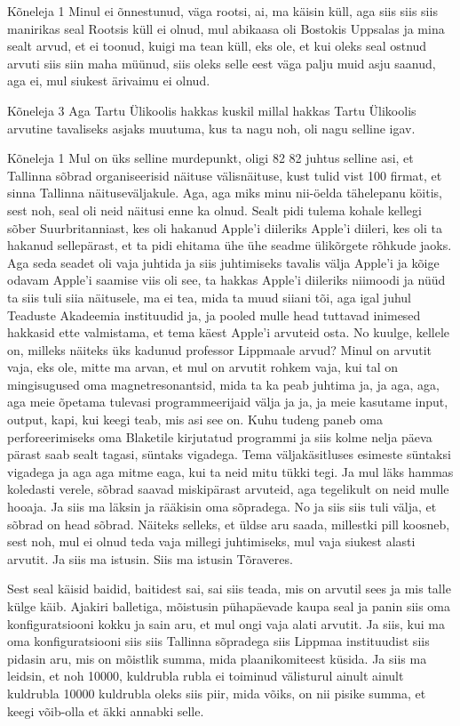 Kõneleja 1
Minul ei õnnestunud, väga rootsi, ai, ma käisin küll, aga siis siis siis manirikas seal Rootsis küll ei olnud, mul abikaasa oli Bostokis Uppsalas ja mina sealt arvud, et ei toonud, kuigi ma tean küll, eks ole, et kui oleks seal ostnud arvuti siis siin maha müünud, siis oleks selle eest väga palju muid asju saanud, aga ei, mul siukest ärivaimu ei olnud. 

Kõneleja 3
Aga Tartu Ülikoolis hakkas kuskil millal hakkas Tartu Ülikoolis arvutine tavaliseks asjaks muutuma, kus ta nagu noh, oli nagu selline igav. 

Kõneleja 1
Mul on üks selline murdepunkt, oligi 82 82 juhtus selline asi, et Tallinna sõbrad organiseerisid näituse välisnäituse, kust tulid vist 100 firmat, et sinna Tallinna näituseväljakule. Aga, aga miks minu nii-öelda tähelepanu köitis, sest noh, seal oli neid näitusi enne ka olnud. Sealt pidi tulema kohale kellegi sõber Suurbritanniast, kes oli hakanud Apple'i diileriks Apple'i diileri, kes oli ta hakanud sellepärast, et ta pidi ehitama ühe ühe seadme ülikõrgete rõhkude jaoks. Aga seda seadet oli vaja juhtida ja siis juhtimiseks tavalis välja Apple'i ja kõige odavam Apple'i saamise viis oli see, ta hakkas Apple'i diileriks niimoodi ja nüüd ta siis tuli siia näitusele, ma ei tea, mida ta muud siiani tõi, aga igal juhul Teaduste Akadeemia instituudid ja, ja pooled mulle head tuttavad inimesed hakkasid ette valmistama, et tema käest Apple'i arvuteid osta. No kuulge, kellele on, milleks näiteks üks kadunud professor Lippmaale arvud? Minul on arvutit vaja, eks ole, mitte ma arvan, et mul on arvutit rohkem vaja, kui tal on mingisugused oma magnetresonantsid, mida ta ka peab juhtima ja, ja aga, aga, aga meie õpetama tulevasi programmeerijaid välja ja ja, ja meie kasutame input, output, kapi, kui keegi teab, mis asi see on. Kuhu tudeng paneb oma perforeerimiseks oma Blaketile kirjutatud programmi ja siis kolme nelja päeva pärast saab sealt tagasi, süntaks vigadega. Tema väljakäsitluses esimeste süntaksi vigadega ja aga aga mitme eaga, kui ta neid mitu tükki tegi. Ja mul läks hammas koledasti verele, sõbrad saavad miskipärast arvuteid, aga tegelikult on neid mulle hooaja. Ja siis ma läksin ja rääkisin oma sõpradega. No ja siis siis tuli välja, et sõbrad on head sõbrad. Näiteks selleks, et üldse aru saada, millestki pill koosneb, sest noh, mul ei olnud teda vaja millegi juhtimiseks, mul vaja siukest alasti arvutit. Ja siis ma istusin. Siis ma istusin Tõraveres. 

Sest seal käisid baidid, baitidest sai, sai siis teada, mis on arvutil sees ja mis talle külge käib. Ajakiri balletiga, mõistusin pühapäevade kaupa seal ja panin siis oma konfiguratsiooni kokku ja sain aru, et mul ongi vaja alati arvutit. Ja siis, kui ma oma konfiguratsiooni siis siis Tallinna sõpradega siis Lippmaa instituudist siis pidasin aru, mis on mõistlik summa, mida plaanikomiteest küsida. Ja siis ma leidsin, et noh 10000, kuldrubla rubla ei toiminud välisturul ainult ainult kuldrubla 10000 kuldrubla oleks siis piir, mida võiks, on nii pisike summa, et keegi võib-olla et äkki annabki selle. 

